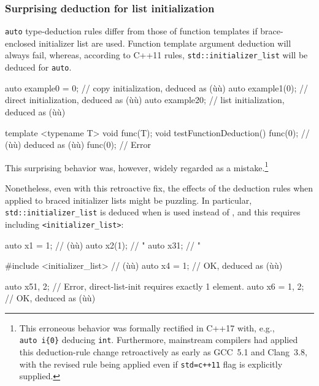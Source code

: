 \subsubsection[Surprising deduction for list initialization]{Surprising deduction for list initialization}\label{surprising-deduction-for-list-initialization}

\lstinline!auto! type-deduction rules differ from those of function
templates if brace-enclosed initializer list are used. Function template
argument deduction will always fail, whereas, according to C++11 rules,
\lstinline!std::initializer_list! will be deduced for \lstinline!auto!.

\begin{emcppslisting}
auto example0 = 0; // copy initialization, deduced as (ù{}ù)
auto example1(0);  // direct initialization, deduced as (ù{}ù)
auto example2{0};  // list initialization, deduced as (ù{}ù)

template <typename T> void func(T);
void testFunctionDeduction()
{
    func(0);    // (ù{}ù) deduced as (ù{}ù)
    func({0});  // Error
}
\end{emcppslisting}
    
\noindent This surprising behavior was, however, widely regarded as a mistake.\footnote{This erroneous behavior was formally rectified in C++17 with, e.g., \lstinline!auto!~\lstinline!i{0}!
deducing \lstinline!int!. Furthermore, mainstream compilers had applied
this deduction-rule change retroactively as early as GCC~5.1 and Clang~3.8, with the revised rule being applied even if \lstinline!std=c++11!
flag is explicitly supplied.}

Nonetheless, even with this retroactive fix, the effects of the
deduction rules when applied to braced initializer lists might be
puzzling. In particular, \lstinline!std::initializer_list! is deduced when
 is used instead of
, and this requires including \lstinline!<initializer_list>!:

\begin{emcppslisting}
auto x1 = 1;                 // (ù{}ù)
auto x2(1);                  //  "
auto x3{1};                  //  "

#include <initializer_list>  // (ù{}ù)
auto x4 = {1};               // OK, deduced as (ù{}ù)

auto x5{1, 2};               // Error, direct-list-init requires exactly 1 element.
auto x6 = {1, 2};            // OK, deduced as (ù{}ù)
\end{emcppslisting}
    

